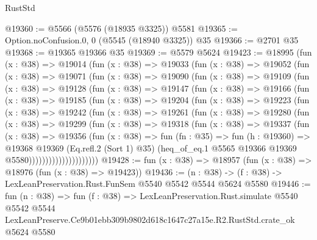 \begin{lexlean}{RustStd}
\begin{coremodule}
@19360 := @5566 (@5576 (@18935 @3325)) @5581
@19365 := Option.noConfusion.{0, 0} (@5545 (@18940 @3325)) @35
@19366 := @2701 @35
@19368 := @19365 @19366 @35
@19369 := @5579 @5624
@19423 := @18995
    (fun (x : @38) =>
    @19014
      (fun (x : @38) =>
      @19033
        (fun (x : @38) =>
        @19052
          (fun (x : @38) =>
          @19071
            (fun (x : @38) =>
            @19090
              (fun (x : @38) =>
              @19109
                (fun (x : @38) =>
                @19128
                  (fun (x : @38) =>
                  @19147
                    (fun (x : @38) =>
                    @19166
                      (fun (x : @38) =>
                      @19185
                        (fun (x : @38) =>
                        @19204
                          (fun (x : @38) =>
                          @19223
                            (fun (x : @38) =>
                            @19242
                              (fun (x : @38) =>
                              @19261
                                (fun (x : @38) =>
                                @19280
                                  (fun (x : @38) =>
                                  @19299
                                    (fun (x : @38) =>
                                    @19318
                                      (fun (x : @38) =>
                                      @19337
                                        (fun (x : @38) =>
                                        @19356
                                          (fun (x : @38) =>
                                          fun (fn : @35) =>
                                          fun (h : @19360) =>
                                          @19368
                                            @19369
                                            (Eq.refl.{2} (Sort 1) @35)
                                            (heq_of_eq.{1}
                                              @5565
                                              @19366
                                              @19369
                                              @5580)))))))))))))))))))))
@19428 := fun (x : @38) => @18957 (fun (x : @38) => @18976 (fun (x : @38) => @19423))
@19436 := (n : @38) -> (f : @38) -> LexLeanPreservation.Rust.FunSem @5540 @5542 @5544 @5624 @5580
@19446 := fun (n : @38) =>
  fun (f : @38) =>
  LexLeanPreservation.Rust.simulate
    @5540
    @5542
    @5544
    LexLeanPreserve.Ce9b01ebb309b9802d618c1647c27a15e.R2.RustStd.crate_ok
    @5624
    @5580
\end{coremodule}
\end{lexlean}
